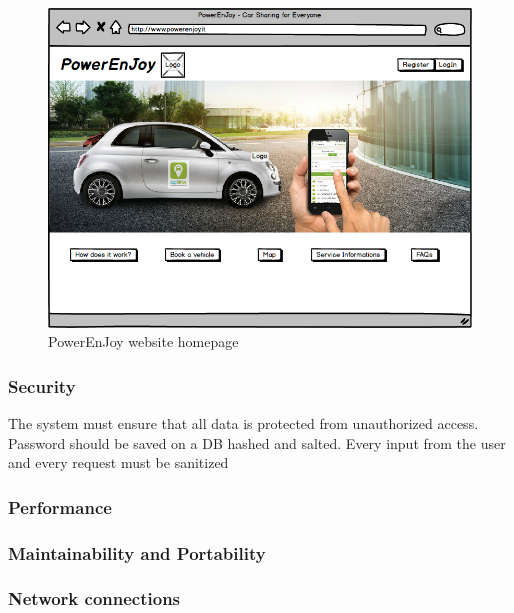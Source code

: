 \documentclass[english]{article}
\begin{document}
\begin{itemize}
\begin{figure}[h]
	\centering
\includegraphics[scale=0.4]{img/webhome}
	\caption{PowerEnJoy website homepage}
\end{figure}
\FloatBarrier



\subsubsection{Security}

The system must ensure that all data is protected from unauthorized
access. Password should be saved on a DB hashed and salted.
Every input from the user and every request must be sanitized 

\end{itemize}

\pagebreak{}




\subsubsection{Performance}


\subsubsection{Maintainability and Portability}




\subsubsection{Network connections}
\end{document}
